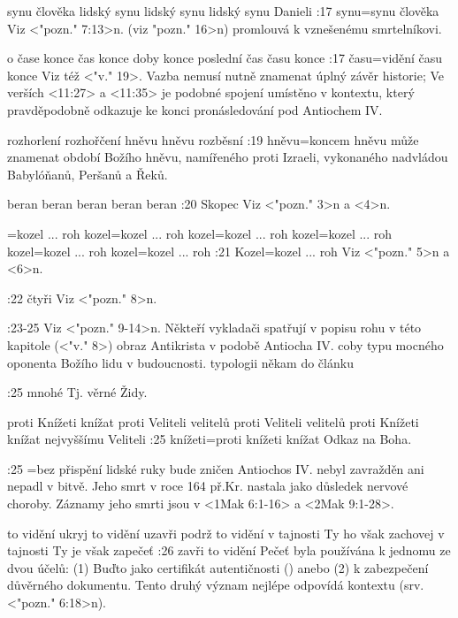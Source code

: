     {synu člověka} %
    {lidský synu}  %
    {lidský synu} %
    {lidský synu}  %
    {Danieli}  %
:17 {synu}={synu člověka} Viz <"pozn." 7:13>n.  (viz \<"pozn." 16>n) promlouvá k vznešenému smrtelníkovi.

   {o čase konce}   %
   {čas konce}   %
   {doby konce}   %
   {poslední čas}   %
   {času konce}   %
:17 {času}={vidění času konce} Viz též <"v." 19>. Vazba nemusí nutně znamenat úplný závěr historie; Ve verších <11:27> a <11:35> je podobné spojení umístěno v kontextu, který pravděpodobně odkazuje ke konci pronásledování pod Antiochem IV.

   {rozhorlení}   %
   {rozhořčení}   %
   {hněvu}   %
   {hněvu}   %
   {rozběsní}   %
:19 {hněvu}={koncem hněvu}  může znamenat období Božího hněvu, namířeného proti   Izraeli, vykonaného nadvládou Babylóňanů, Peršanů a Řeků. 

   {beran}   %
   {beran}   %
   {beran}   %
   {beran}   %
   {beran}   %
:20 {Skopec} Viz <"pozn." 3>n a <4>n.

={kozel ... roh}   %
   {kozel}={kozel ... roh}   %
   {kozel}={kozel ... roh}   %
   {kozel}={kozel ... roh}   %
   {kozel}={kozel ... roh}   %
   {kozel}={kozel ... roh}   %
:21 {Kozel}={kozel ... roh} Viz <"pozn." 5>n a <6>n.

:22 {čtyři} Viz  <"pozn." 8>n.

:23-25 {} Viz  <"pozn." 9-14>n. Někteří vykladači spatřují v popisu rohu v této kapitole (<"v." 8>)
obraz Antikrista v podobě Antiocha IV. coby typu mocného oponenta Božího lidu v budoucnosti.  
\dopsat typologii někam do článku

:25 {mnohé} Tj. věrné Židy.

   {proti Knížeti knížat}   %
   {proti Veliteli velitelů}   %
   {proti Veliteli velitelů}   %
   {proti Knížeti knížat}   %
   {nejvyššímu Veliteli}   %
:25 {knížeti}={proti knížeti knížat} Odkaz na Boha.

:25 {}={bez přispění lidské ruky bude zničen} Antiochos IV. nebyl zavražděn ani nepadl v bitvě. Jeho smrt v roce 164 př.Kr. nastala jako důsledek nervové choroby. Záznamy jeho smrti jsou v <1Mak 6:1-16> a <2Mak 9:1-28>.

    {to vidění ukryj}  %
    {to vidění uzavři}  %
    {podrž to vidění v tajnosti}  %
    {Ty ho však zachovej v tajnosti}  %
    {Ty je však zapečeť}  %
:26 {zavři to vidění} Pečeť byla používána k jednomu ze dvou účelů: (1) Buďto jako certifikát autentičnosti () anebo (2) k zabezpečení  důvěrného dokumentu. Tento druhý význam nejlépe odpovídá kontextu (srv. <"pozn." 6:18>n).


